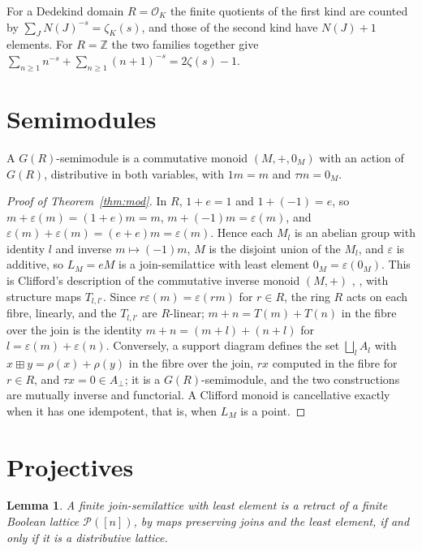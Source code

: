 \documentclass[11pt]{amsart}
\newtheorem{lemma}[thm]{Lemma}
\theoremstyle{remark}
\begin{document}
For a Dedekind domain $R=\mathcal O_K$ the finite quotients of the first kind are counted by $\sum_J N(J)^{-s}=\zeta_K(s)$, and those of the second kind have $N(J)+1$ elements. For $R=\mathbb Z$ the two families together give $\sum_{n\ge1}n^{-s}+\sum_{n\ge1}(n+1)^{-s}=2\zeta(s)-1$.

\section{Semimodules}

A $G(R)$-semimodule is a commutative monoid $(M,+,0_M)$ with an action of $G(R)$, distributive in both variables, with $1m=m$ and $\tau m=0_M$.

\begin{proof}[Proof of Theorem~\ref{thm:mod}]
In $R$, $1+e=1$ and $1+(-1)=e$, so $m+\varepsilon(m)=(1+e)m=m$, $m+(-1)m=\varepsilon(m)$, and $\varepsilon(m)+\varepsilon(m)=(e+e)m=\varepsilon(m)$. Hence each $M_l$ is an abelian group with identity $l$ and inverse $m\mapsto(-1)m$, $M$ is the disjoint union of the $M_l$, and $\varepsilon$ is additive, so $L_M=eM$ is a join-semilattice with least element $0_M=\varepsilon(0_M)$. This is Clifford's description of the commutative inverse monoid $(M,+)$ \cite{Clifford}, \cite[Ch.~4]{Howie}, with structure maps $T_{l,l'}$. Since $r\varepsilon(m)=\varepsilon(rm)$ for $r\in R$, the ring $R$ acts on each fibre, linearly, and the $T_{l,l'}$ are $R$-linear; $m+n=T(m)+T(n)$ in the fibre over the join is the identity $m+n=(m+l)+(n+l)$ for $l=\varepsilon(m)+\varepsilon(n)$. Conversely, a support diagram defines the set $\bigsqcup_lA_l$ with $x\boxplus y=\rho(x)+\rho(y)$ in the fibre over the join, $rx$ computed in the fibre for $r\in R$, and $\tau x=0\in A_{\bot}$; it is a $G(R)$-semimodule, and the two constructions are mutually inverse and functorial. A Clifford monoid is cancellative exactly when it has one idempotent, that is, when $L_M$ is a point.
\end{proof}

\section{Projectives}\label{sec:proj}

\begin{lemma}\label{lem:retract}
A finite join-semilattice with least element is a retract of a finite Boolean lattice $\mathcal P([n])$, by maps preserving joins and the least element, if and only if it is a distributive lattice.
\end{lemma}
\end{document}
